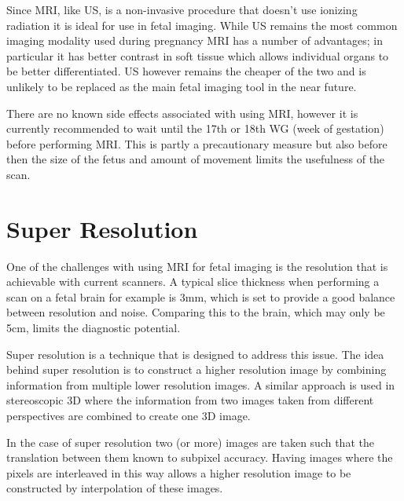 Since MRI, like US, is a non-invasive procedure that doesn’t use ionizing radiation it is ideal for use in fetal imaging. While US remains the most common imaging modality used during pregnancy MRI has a number of advantages; in particular it has better contrast in soft tissue which allows individual organs to be better differentiated. US however remains the cheaper of the two and is unlikely to be replaced as the main fetal imaging tool in the near future.

There are no known side effects associated with using MRI, however it is currently recommended to wait until the 17th or 18th WG (week of gestation) before performing MRI. This is partly a precautionary measure but also before then the size of the fetus and amount of movement limits the usefulness of the scan.

\newpage
\section{Super Resolution}\label{background:superresolution}\cite{superresolution1}\cite{superresolution2}
One of the challenges with using MRI for fetal imaging is the resolution that is achievable with current scanners. A typical slice thickness when performing a scan on a fetal brain for example is 3mm, which is set to provide a good balance between resolution and noise. Comparing this to the brain, which may only be 5cm, limits the diagnostic potential.

Super resolution is a technique that is designed to address this issue. The idea behind super resolution is to construct a higher resolution image by combining information from multiple lower resolution images. A similar approach is used in stereoscopic 3D where the information from two images taken from different perspectives are combined to create one 3D image.

In the case of super resolution two (or more) images are taken such that the translation between them known to subpixel accuracy. Having images where the pixels are interleaved in this way allows a higher resolution image to be constructed by interpolation of these images.

